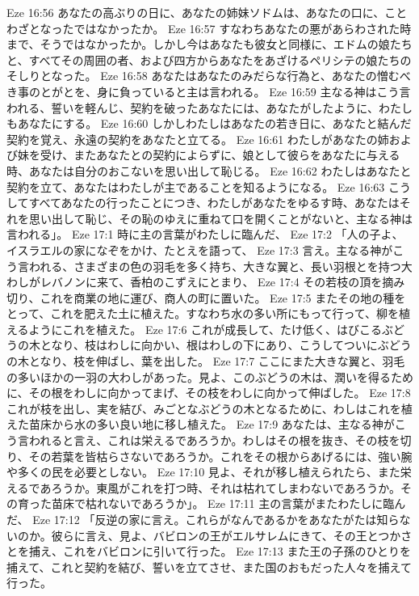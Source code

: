 Eze 16:56  あなたの高ぶりの日に、あなたの姉妹ソドムは、あなたの口に、ことわざとなったではなかったか。
Eze 16:57  すなわちあなたの悪があらわされた時まで、そうではなかったか。しかし今はあなたも彼女と同様に、エドムの娘たちと、すべてその周囲の者、および四方からあなたをあざけるペリシテの娘たちのそしりとなった。
Eze 16:58  あなたはあなたのみだらな行為と、あなたの憎むべき事のとがとを、身に負っていると主は言われる。
Eze 16:59  主なる神はこう言われる、誓いを軽んじ、契約を破ったあなたには、あなたがしたように、わたしもあなたにする。
Eze 16:60  しかしわたしはあなたの若き日に、あなたと結んだ契約を覚え、永遠の契約をあなたと立てる。
Eze 16:61  わたしがあなたの姉および妹を受け、またあなたとの契約によらずに、娘として彼らをあなたに与える時、あなたは自分のおこないを思い出して恥じる。
Eze 16:62  わたしはあなたと契約を立て、あなたはわたしが主であることを知るようになる。
Eze 16:63  こうしてすべてあなたの行ったことにつき、わたしがあなたをゆるす時、あなたはそれを思い出して恥じ、その恥のゆえに重ねて口を開くことがないと、主なる神は言われる」。
Eze 17:1  時に主の言葉がわたしに臨んだ、
Eze 17:2  「人の子よ、イスラエルの家になぞをかけ、たとえを語って、
Eze 17:3  言え。主なる神がこう言われる、さまざまの色の羽毛を多く持ち、大きな翼と、長い羽根とを持つ大わしがレバノンに来て、香柏のこずえにとまり、
Eze 17:4  その若枝の頂を摘み切り、これを商業の地に運び、商人の町に置いた。
Eze 17:5  またその地の種をとって、これを肥えた土に植えた。すなわち水の多い所にもって行って、柳を植えるようにこれを植えた。
Eze 17:6  これが成長して、たけ低く、はびこるぶどうの木となり、枝はわしに向かい、根はわしの下にあり、こうしてついにぶどうの木となり、枝を伸ばし、葉を出した。
Eze 17:7  ここにまた大きな翼と、羽毛の多いほかの一羽の大わしがあった。見よ、このぶどうの木は、潤いを得るために、その根をわしに向かってまげ、その枝をわしに向かって伸ばした。
Eze 17:8  これが枝を出し、実を結び、みごとなぶどうの木となるために、わしはこれを植えた苗床から水の多い良い地に移し植えた。
Eze 17:9  あなたは、主なる神がこう言われると言え、これは栄えるであろうか。わしはその根を抜き、その枝を切り、その若葉を皆枯らさないであろうか。これをその根からあげるには、強い腕や多くの民を必要としない。
Eze 17:10  見よ、それが移し植えられたら、また栄えるであろうか。東風がこれを打つ時、それは枯れてしまわないであろうか。その育った苗床で枯れないであろうか」。
Eze 17:11  主の言葉がまたわたしに臨んだ、
Eze 17:12  「反逆の家に言え。これらがなんであるかをあなたがたは知らないのか。彼らに言え、見よ、バビロンの王がエルサレムにきて、その王とつかさとを捕え、これをバビロンに引いて行った。
Eze 17:13  また王の子孫のひとりを捕えて、これと契約を結び、誓いを立てさせ、また国のおもだった人々を捕えて行った。
